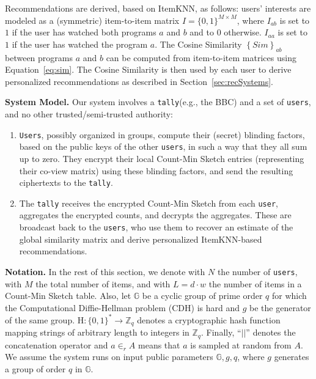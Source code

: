 \documentclass[conference]{IEEEtran}
\newcommand{\descr}[1]{\medskip \noindent \textbf{#1}}
\newcommand{\Zq}{\mathbb{Z}_q}
\newcommand{\user}{{\tt user}\xspace}
\newcommand{\users}{{\tt users}\xspace}
\newcommand{\Users}{{\tt Users}\xspace}
\newcommand{\tally}{{\tt tally}\xspace}
\begin{document}
Recommendations are derived, based on ItemKNN, as follows: users' interests are modeled as a (symmetric) item-to-item matrix $I = \lbrace{ 0, 1 \rbrace}^{M \times M}$, where $I_{ab}$ is set to $1$ if the user has watched both  programs $a$ and $b$ and to $0$ otherwise.
$I_{aa}$ is set to $1$ if the user has watched the program $a$.
The Cosine Similarity $\left\{ Sim \right\}_{ab}$ between programs $a$ and $b$ can be computed from item-to-item matrices using Equation~\ref{eq:sim}.
The Cosine Similarity is then used by each user to derive personalized recommendations as described in Section~\ref{sec:recSystems}. 

\descr{System Model.} Our system involves a \tally (e.g., the BBC) and a set of \users, and no other trusted/semi-trusted authority: 


\begin{enumerate}
\itemsep0em
\item{\Users}, possibly organized in groups, compute their (secret) blinding factors, based on the public keys of the other \users, in such a way that they all sum up to zero. They encrypt their local Count-Min Sketch entries (representing their co-view matrix) using these blinding factors, and send the resulting ciphertexts to the \tally. \smallskip

\item The {\tally} receives the encrypted Count-Min Sketch from each \user, aggregates the encrypted counts, and decrypts the aggregates. These are broadcast back to the \users, who use them to recover an estimate of the global similarity matrix and derive personalized ItemKNN-based recommendations.


\end{enumerate}

\descr{Notation.} In the rest of this section, we denote with $N$ the number of \users, with $M$ the total number of items, and with $L=d \cdot w$ the number of items in a Count-Min Sketch table.
Also, let $\mathbb{G}$ be a cyclic group of prime order $q$ for which the Computational Diffie-Hellman problem (CDH) is hard and $g$ be the generator of the same group. 
$\textrm{H}:\lbrace{0,1\rbrace}^* \rightarrow \Zq$ denotes a cryptographic hash function mapping strings of arbitrary length to integers in $\Zq$. Finally, ``$||$'' denotes the concatenation operator and $a \in_r A$ means that $a$ is sampled at random from $A$.
We assume the system runs on input public parameters $\mathbb{G}, g, q$, where $g$ generates a group of order $q$ in $\mathbb{G}$. 
\end{document}
